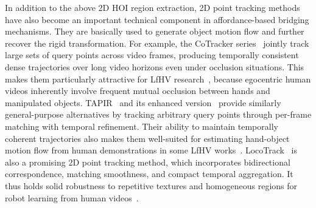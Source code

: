 \documentclass[Afour,sageh,times]{sagej}
\begin{document}
In addition to the above 2D HOI region extraction, 2D point tracking methods have also become an important technical component in affordance-based bridging mechanisms. They are basically used to generate object motion flow and further recover the rigid transformation. For example, the CoTracker series~\citep{karaev2024cotracker,karaev2025cotracker3} jointly track large sets of query points across video frames, producing temporally consistent dense trajectories over long video horizons even under occlusion situations. This makes them particularly attractive for LfHV research~\citep{bharadhwaj2024track2act,li2024okami,yuan2024general,werby2025articulated,chen2025visa,hsu2025spot,guzey2025bridging,chen2025graphmimic,haldar2025point,liu2025egozero,ci2025h2r,tang2025functo,guzey2025dexterity,shi2026care}, because egocentric human videos inherently involve frequent mutual occlusion between hands and manipulated objects. TAPIR~\citep{doersch2023tapir} and its enhanced version~\citep{doersch2024bootstap} provide similarly general-purpose alternatives by tracking arbitrary query points through per-frame matching with temporal refinement. Their ability to maintain temporally coherent trajectories also makes them well-suited for estimating hand-object motion flow from human demonstrations in some LfHV works~\citep{xu2024flow,papagiannis2025r,chen2025graphmimic,spiridonov2025generalist}. LocoTrack~\citep{cho2024local} is also a promising 2D point tracking method, which incorporates bidirectional correspondence, matching smoothness, and compact temporal aggregation. It thus holds solid robustness to repetitive textures and homogeneous regions for robot learning from human videos~\citep{hu2025learning}.
\end{document}
